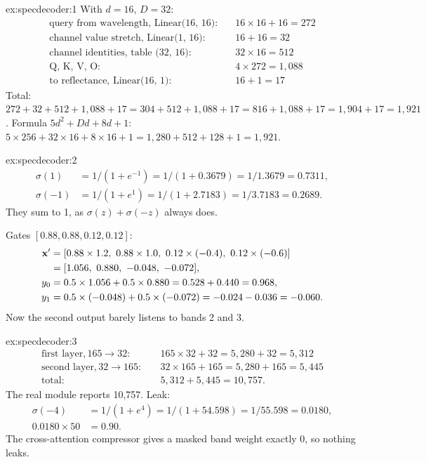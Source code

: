 
\begin{solution}{ex:specdecoder:1}
With $d = 16$, $D = 32$:
\begin{align*}
  \text{query from wavelength, Linear(16, 16)}:&\quad 16\times16 + 16 = 272\\
  \text{channel value stretch, Linear(1, 16)}:&\quad 16 + 16 = 32\\
  \text{channel identities, table (32, 16)}:&\quad 32\times16 = 512\\
  \text{Q, K, V, O}:&\quad 4\times272 = 1{,}088\\
  \text{to reflectance, Linear(16, 1)}:&\quad 16 + 1 = 17
\end{align*}
Total: $272 + 32 + 512 + 1{,}088 + 17 = 304 + 512 + 1{,}088 + 17 = 816 + 1{,}088 + 17 = 1{,}904 + 17 = 1{,}921$.
Formula $5d^2 + Dd + 8d + 1$: $5\times256 + 32\times16 + 8\times16 + 1 = 1{,}280 + 512 + 128 + 1 = 1{,}921$.
\end{solution}

\begin{solution}{ex:specdecoder:2}
\begin{align*}
  \sigma(1) &= 1/(1 + e^{-1}) = 1/(1 + 0.3679) = 1/1.3679 = 0.7311,\\
  \sigma(-1) &= 1/(1 + e^{1}) = 1/(1 + 2.7183) = 1/3.7183 = 0.2689 .
\end{align*}
They sum to 1, as $\sigma(z) + \sigma(-z)$ always does.

Gates $[0.88, 0.88, 0.12, 0.12]$:
\begin{align*}
  \vect{x}' &= [0.88\times1.2,\ 0.88\times1.0,\ 0.12\times(-0.4),\ 0.12\times(-0.6)]\\
  &= [1.056,\ 0.880,\ -0.048,\ -0.072],\\
  y_0 &= 0.5\times1.056 + 0.5\times0.880 = 0.528 + 0.440 = 0.968,\\
  y_1 &= 0.5\times(-0.048) + 0.5\times(-0.072) = -0.024 - 0.036 = -0.060 .
\end{align*}
Now the second output barely listens to bands 2 and 3.
\end{solution}

\begin{solution}{ex:specdecoder:3}
\begin{align*}
  \text{first layer}, 165\to32:&\quad 165\times32 + 32 = 5{,}280 + 32 = 5{,}312\\
  \text{second layer}, 32\to165:&\quad 32\times165 + 165 = 5{,}280 + 165 = 5{,}445\\
  \text{total}:&\quad 5{,}312 + 5{,}445 = 10{,}757 .
\end{align*}
The real module reports 10,757. Leak:
\begin{align*}
  \sigma(-4) &= 1/(1 + e^{4}) = 1/(1 + 54.598) = 1/55.598 = 0.0180,\\
  0.0180\times50 &= 0.90 .
\end{align*}
The cross-attention compressor gives a masked band weight exactly 0, so nothing leaks.
\end{solution}

